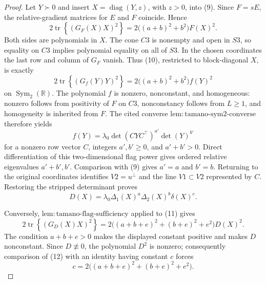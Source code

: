 \documentclass{article}
\begin{document}
\begin{proof}
Let \(Y\succ0\) and insert \(X=\operatorname{diag}(Y,z)\), with
\(z>0\), into (9).  Since \(F=sE\), the relative-gradient matrices for
\(E\) and \(F\) coincide.  Hence
\[
 2\operatorname{tr}\!\left\{(G_F(X)X)^2\right\}
 =2\bigl((a+b)^2+b^2\bigr)F(X)^2.                                   \tag{10}
\]
Both sides are polynomials in \(X\).  The cone \(C3\) is nonempty and
open in \(S3\), so equality on \(C3\) implies polynomial equality on
all of \(S3\).  In the chosen coordinates the last row and column of
\(G_F\) vanish.  Thus (10), restricted to block-diagonal \(X\), is
exactly
\[
 2\operatorname{tr}\!\left\{(G_f(Y)Y)^2\right\}
 =2\bigl((a+b)^2+b^2\bigr)f(Y)^2
\]
on \(\operatorname{Sym}_2(\mathbb R)\).  The polynomial \(f\) is
nonzero, nonconstant, and homogeneous: nonzero follows from positivity
of \(F\) on \(C3\), nonconstancy follows from \(L\geq1\), and
homogeneity is inherited from \(F\).  The cited converse
\(\mathrm{lem{:}tamano\text{-}sym2\text{-}converse}\) therefore yields
\[
 f(Y)=\lambda_0\det(CYC^{\top})^{a'}\det(Y)^{b'}
\]
for a nonzero row vector \(C\), integers \(a',b'\geq0\), and
\(a'+b'>0\).  Direct differentiation of this two-dimensional flag
power gives ordered relative eigenvalues \(a'+b',b'\).  Comparison with
(9) gives \(a'=a\) and \(b'=b\).  Returning to the original coordinates
identifies \(V2=u^{\perp}\) and the line \(V1\subset V2\) represented by
\(C\).  Restoring the stripped determinant proves
\[
 D(X)=\lambda_0\Delta_1(X)^a\Delta_2(X)^b\delta(X)^e.                \tag{11}
\]

Conversely, \(\mathrm{lem{:}tamano\text{-}flag\text{-}sufficiency}\)
applied to (11) gives
\[
 2\operatorname{tr}\!\left\{(G_D(X)X)^2\right\}
 =2\bigl((a+b+e)^2+(b+e)^2+e^2\bigr)D(X)^2.                         \tag{12}
\]
The condition \(a+b+e>0\) makes the displayed constant positive and
makes \(D\) nonconstant.  Since \(D\not\equiv0\), the polynomial
\(D^2\) is nonzero; consequently comparison of (12) with an identity
having constant \(c\) forces
\[
 c=2\bigl((a+b+e)^2+(b+e)^2+e^2\bigr).
\]


\end{proof}
\end{document}
